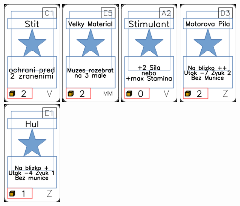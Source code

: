 \documentclass[a4paper]{article}
\begin{document}
	\includegraphics[width=3.0cm]{img-1_70}
	\includegraphics[width=3.0cm]{img-1_54}
	\includegraphics[width=3.0cm]{img-1_61}
	\includegraphics[width=3.0cm]{img-1_107}
	\includegraphics[width=3.0cm]{img-1_80}
\end{document}
